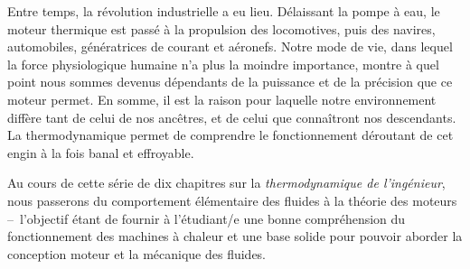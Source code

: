 Entre temps, la révolution industrielle a eu lieu. Délaissant la pompe à eau, le moteur thermique est passé à la propulsion des locomotives, puis des navires, automobiles, génératrices de courant et aéronefs. Notre mode de vie, dans lequel la force physiologique humaine n’a plus la moin\-dre importance, montre à quel point nous som\-mes devenus dépendants de la puissance et de la précision que ce moteur permet. En somme, il est la raison pour laquelle notre environnement diffère tant de celui de nos ancêtres, et de celui que connaîtront nos descendants. La thermodynamique permet de comprendre le fonctionnement déroutant de cet engin à la fois banal et effroyable.

Au cours de cette série de dix chapitres sur la \textit{thermodynamique de l’ingénieur}, nous passerons du comportement élémentaire des fluides à la théorie des moteurs –\ l’objectif étant de fournir à l’étudiant/e une bonne compréhension du fonctionnement des machines à chaleur et une base solide pour pouvoir aborder la conception moteur et la mécanique des fluides.

